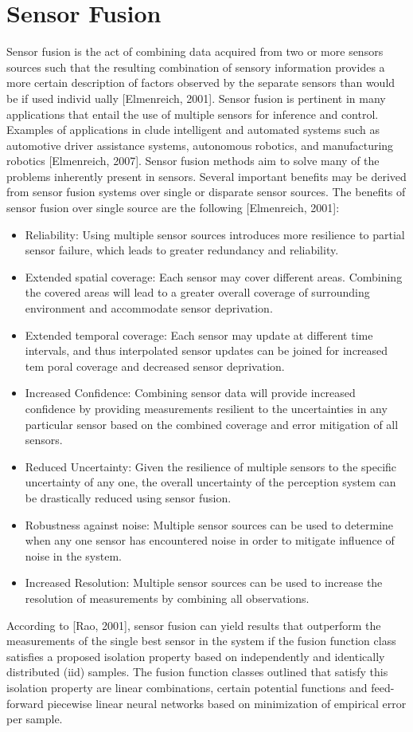 \section{Sensor Fusion}
Sensor fusion is the act of combining data acquired from two or more sensors sources
such that the resulting combination of sensory information provides a more certain description of factors observed by the separate sensors than would be if used individ
ually [Elmenreich, 2001]. Sensor fusion is pertinent in many applications that entail
the use of multiple sensors for inference and control. Examples of applications in
clude intelligent and automated systems such as automotive driver assistance systems,
autonomous robotics, and manufacturing robotics [Elmenreich, 2007].
Sensor fusion methods aim to solve many of the problems inherently present in
sensors. Several important beneﬁts may be derived from sensor fusion systems over
single or disparate sensor sources. The beneﬁts of sensor fusion over single source are
the following [Elmenreich, 2001]:
\begin{itemize}
 \item Reliability: Using multiple sensor sources introduces more resilience to partial sensor failure, which leads to greater redundancy and reliability.
 \item Extended spatial coverage: Each sensor may cover diﬀerent areas. Combining the covered areas will lead to a greater overall coverage of surrounding
environment and accommodate sensor deprivation.
 \item Extended temporal coverage: Each sensor may update at diﬀerent time intervals, and thus interpolated sensor updates can be joined for increased tem
poral coverage and decreased sensor deprivation.
 \item Increased Conﬁdence: Combining sensor data will provide increased conﬁdence by providing measurements resilient to the uncertainties in any particular
sensor based on the combined coverage and error mitigation of all sensors. \item  Reduced Uncertainty: Given the resilience of multiple sensors to the speciﬁc uncertainty of any one, the overall uncertainty of the perception system can be
drastically reduced using sensor fusion.
 \item Robustness against noise: Multiple sensor sources can be used to determine when any one sensor has encountered noise in order to mitigate inﬂuence of
noise in the system.
 \item Increased Resolution: Multiple sensor sources can be used to increase the resolution of measurements by combining all observations.
\end{itemize}
According to [Rao, 2001], sensor fusion can yield results that outperform the measurements of the single best sensor in the system if the fusion function class satisﬁes a
proposed isolation property based on independently and identically distributed (iid)
samples. The fusion function classes outlined that satisfy this isolation property
are linear combinations, certain potential functions and feed-forward piecewise linear
neural networks based on minimization of empirical error per sample.



